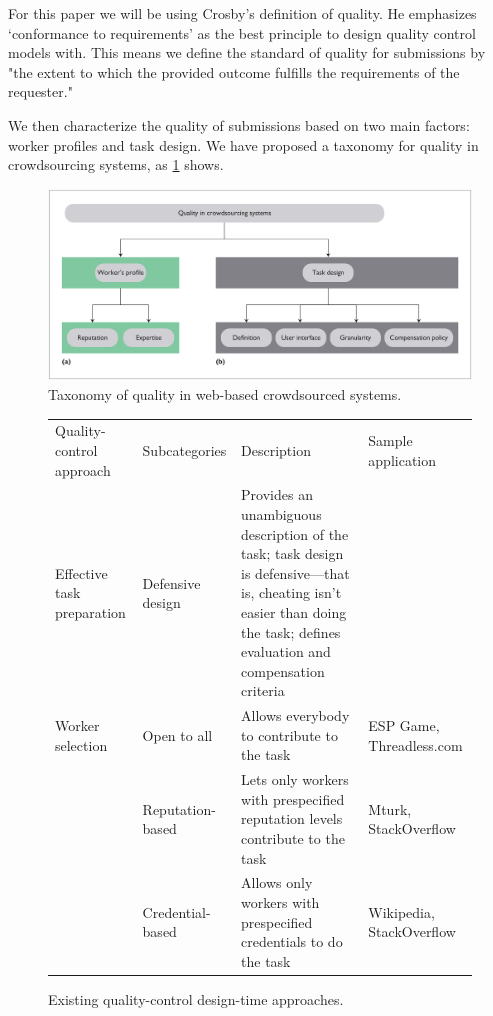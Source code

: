 \documentclass[9pt,twocolumn]{article}
\begin{document}
	For this paper we will be using Crosby's definition of quality. \cite{crosby1996quality} He emphasizes `conformance to requirements' as the best principle to design quality control models with. This means we define the standard of quality for submissions by \\
	"the extent to which the provided outcome fulfills the requirements of the requester."
	
	We then characterize the quality of submissions based on two main factors: worker profiles and task design. We have proposed a taxonomy for quality in crowdsourcing systems, as \cref{fig-taxonomy} shows.
	
	\begin{figure}
		\includegraphics[width=\textwidth]{taxonomy}
		\caption{Taxonomy of quality in web-based crowdsourced systems.}
		\label{fig-taxonomy}
	\end{figure}

	
	
	
	
	\begin{figure}
	\begin{tabularx}{\textwidth}{|XlXl|}		
		\rowcolor{gray!50}
		\hline
		Quality-control approach & Subcategories & Description & Sample application\\
		Effective task preparation & Defensive design & Provides an unambiguous description of the task; task design is defensive---that is, cheating isn't easier than doing the task; defines evaluation and compensation criteria &  \\
		Worker selection & Open to all & Allows everybody to contribute to the task & ESP Game, Threadless.com \\
										  & Reputation-based & Lets only workers with prespecified reputation levels contribute to the task & Mturk, StackOverflow \\
										  & Credential-based & Allows only workers with prespecified credentials to do the task & Wikipedia, StackOverflow \\ \hline
	\end{tabularx}
	\caption{Existing quality-control design-time approaches.}
	\label{fig-tbl1}
	\end{figure}
	
\end{document}
